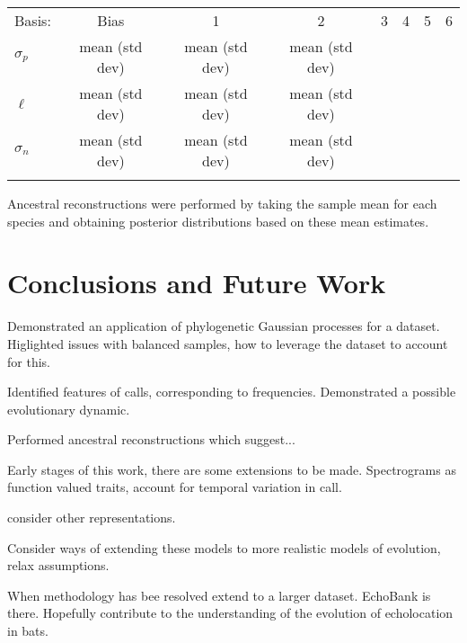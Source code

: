 \documentclass[wsdraft]{ws-rv9x6} %
\begin{document}
\begin{table}[ht]
	{
		\begin{tabular}{@{}lccccccc@{}} \toprule
			Basis: & Bias & 1 & 2 & 3 & 4 & 5 & 6 \\ 
			\colrule
			\(\sigma_p \)  & mean (std dev) & mean (std dev) & mean (std dev) &&&&  \\
			\(\ell\)  & mean (std dev) & mean (std dev) & mean (std dev) &&&& \\
			\(\sigma_n\)  & mean (std dev) & mean (std dev) & mean (std dev) &&&&  \\
			
			\botrule
		\end{tabular}
	}
	\label{tab::bat_results}
\end{table}

Ancestral reconstructions were performed by taking the sample mean for each species and obtaining posterior distributions based on these mean estimates.

\section{Conclusions and Future Work}

Demonstrated an application of phylogenetic Gaussian processes for a dataset. Higlighted issues with balanced samples, how to leverage the dataset to account for this. 

Identified features of calls, corresponding to frequencies. Demonstrated a possible evolutionary dynamic. 

Performed ancestral reconstructions which suggest...

Early stages of this work, there are some extensions to be made. Spectrograms as function valued traits, account for temporal variation in call.

consider other representations.

Consider ways of extending these models to more realistic models of evolution, relax assumptions.

When methodology has bee resolved extend to a larger dataset. EchoBank is there. Hopefully contribute to the understanding of the evolution of echolocation in bats.




\end{document}
